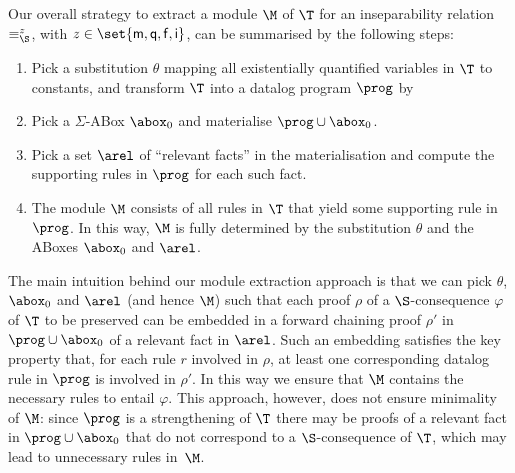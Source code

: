 Our overall strategy to
extract a module $\M$  of $\T$ 
for an inseparability relation $\equiv^z_{\S}$,
with $z \in \set{\mathsf{m},\mathsf{q},\mathsf{f},\mathsf{i}}$, 
can be summarised by the following steps:
% 
\begin{enumerate}
  \item Pick a substitution $\theta$ mapping all existentially 
  quantified variables in $\T$ to 
  constants, and transform $\T$ into a datalog program $\prog$ by 

 \item Pick a $\Sigma$-ABox 
$\abox_0$ and materialise
$\prog \cup \abox_0$.
 \item Pick a set $\arel$ of ``relevant facts'' in the materialisation
 and compute the supporting rules in $\prog$ for
 each such fact.
\item 
The module $\M$ consists of all rules in $\T$ that
yield some supporting rule in $\prog$. In this way,
$\M$ is fully determined
by the substitution $\theta$ and the ABoxes $\abox_0$ and $\arel$.
\end{enumerate}
%
The main intuition behind our module extraction approach is that we
can pick $\theta$, $\abox_0$ and $\arel$ (and hence $\M$) such 
that each proof $\rho$ of a $\S$-consequence $\varphi$ of $\T$ to
be preserved can be embedded in a forward chaining proof $\rho'$
in $\prog \cup \abox_0$
of a relevant fact in $\arel$.
Such an embedding satisfies the key property that, for each rule $r$
involved in $\rho$, at least one corresponding datalog rule in $\prog$
is involved in $\rho'$. In this way we ensure that $\M$ contains the
necessary rules to entail $\varphi$.
%
This approach, however, does not
ensure minimality of $\M$: since 
$\prog$ is a strengthening of $\T$ there may be
proofs of a relevant fact in $\prog \cup \abox_0$ that do not
correspond to a $\S$-consequence of $\T$, which may lead to
unnecessary rules in~$\M$.

